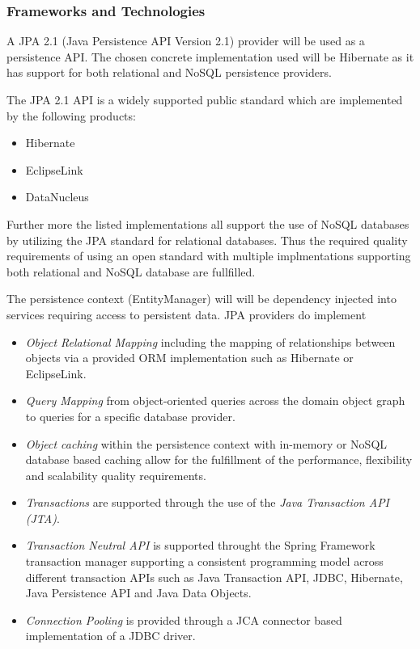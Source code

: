 \subsubsection{Frameworks and Technologies}
A JPA 2.1 (Java Persistence API Version 2.1) provider will be used as a 
persistence API. The chosen concrete implementation used will be Hibernate as
it has support for both relational and NoSQL persistence providers.

The JPA 2.1 API is a widely supported public standard which are implemented by
the following products:
\begin{itemize}
	\item Hibernate
	\item EclipseLink
	\item DataNucleus
\end{itemize}

Further more the listed implementations all support the use of NoSQL databases
by utilizing the JPA standard for relational databases. Thus the required
quality requirements of using an open standard with multiple implmentations
supporting both relational and NoSQL database are fullfilled.

The persistence context (EntityManager) will will be dependency injected into 
services requiring access to persistent data. JPA providers do implement
\begin{itemize}
	\item \textit{Object Relational Mapping} including the mapping of
		relationships between objects via a provided ORM 
		implementation such as Hibernate or EclipseLink.
	\item \textit{Query Mapping} from object-oriented queries across the
		domain object graph to queries for a specific database provider.
	\item \textit{Object caching} within the persistence context with
		in-memory or NoSQL database based caching allow for the 
		fulfillment of the performance, flexibility and scalability
		quality requirements.
	\item \textit{Transactions} are supported through the use of the \textit{Java Transaction API (JTA)}.
	\item \textit{Transaction Neutral API} is supported throught the Spring 
		Framework transaction manager supporting a consistent programming
		model across different transaction APIs such as 
		Java Transaction API, JDBC, Hibernate, Java Persistence API and 
		Java Data Objects.
	\item \textit{Connection Pooling} is provided through a JCA connector 
		based implementation of a JDBC driver.
\end{itemize}

